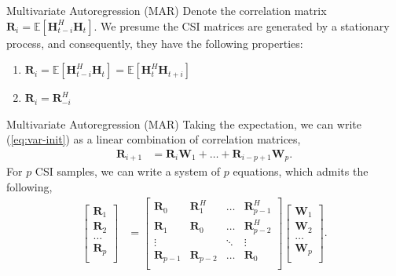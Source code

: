 \documentclass{beamer}
\begin{document}
  \begin{frame}{Multivariate Autoregression (MAR)}
    Denote the correlation matrix 
    $\mathbf R_i = \mathbb E [\mathbf H^H_{t-i}\mathbf H_{t}]$.
    We presume the CSI matrices are generated by a 
    stationary process, and consequently, 
    they have the following properties:
    \begin{enumerate}
      \item $\mathbf R_i = \mathbb E [\mathbf H^H_{t-i}\mathbf H_{t}] = \mathbb E [\mathbf H^H_{t}\mathbf H_{t+i}]$
      \item $\mathbf R_i = \mathbf R^H_{-i}$
    \end{enumerate}
  \end{frame}

  \begin{frame}{Multivariate Autoregression (MAR)}
    Taking the expectation, we can write (\ref{eq:var-init})
    as a linear combination of correlation matrices,
    \begin{align*}
    \mathbf R_{i+1} &= \mathbf{R}_{i} \mathbf W_{1} + \dots + \mathbf{R}_{i-p+1} \mathbf W_{p}. 
    \end{align*}
    For $p$ CSI samples, we can write a system of $p$
    equations, which admits the following,
    \begin{align*}
      \begin{bmatrix}
        \mathbf R_{1} \\ \mathbf R_{2} \\ \dots \\ \mathbf R_{p} \\
      \end{bmatrix}
      &= 
      \begin{bmatrix}
        \mathbf R_{0} & \mathbf R_1^H & \dots  & \mathbf R_{p-1}^H \\
        \mathbf R_{1} & \mathbf R_0   & \dots  & \mathbf R_{p-2}^H \\
        \vdots      &         & \ddots & \vdots \\
        \mathbf R_{p-1} & \mathbf R_{p-2}   & \dots  & \mathbf R_{0} \\
      \end{bmatrix}
      \begin{bmatrix}
        \mathbf W_{1} \\ \mathbf W_{2} \\ \dots \\ \mathbf W_{p} \\
      \end{bmatrix}.
    \end{align*}
  \end{frame}
\end{document}
